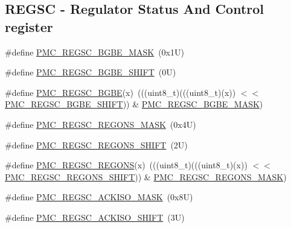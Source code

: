 \subsection*{R\+E\+G\+SC -\/ Regulator Status And Control register}
\begin{DoxyCompactItemize}
\item 
\#define \mbox{\hyperlink{group___p_m_c___register___masks_ga98cf5c98c133e20fb620faa6ca29d98e}{P\+M\+C\+\_\+\+R\+E\+G\+S\+C\+\_\+\+B\+G\+B\+E\+\_\+\+M\+A\+SK}}~(0x1\+U)
\item 
\#define \mbox{\hyperlink{group___p_m_c___register___masks_ga2e23aa8155158c86fc53ccd8baccf24d}{P\+M\+C\+\_\+\+R\+E\+G\+S\+C\+\_\+\+B\+G\+B\+E\+\_\+\+S\+H\+I\+FT}}~(0\+U)
\item 
\#define \mbox{\hyperlink{group___p_m_c___register___masks_gafb37a90d087dbf5bc4c3b654e33d6ef7}{P\+M\+C\+\_\+\+R\+E\+G\+S\+C\+\_\+\+B\+G\+BE}}(x)~(((uint8\+\_\+t)(((uint8\+\_\+t)(x)) $<$$<$ \mbox{\hyperlink{group___p_m_c___register___masks_ga2e23aa8155158c86fc53ccd8baccf24d}{P\+M\+C\+\_\+\+R\+E\+G\+S\+C\+\_\+\+B\+G\+B\+E\+\_\+\+S\+H\+I\+FT}})) \& \mbox{\hyperlink{group___p_m_c___register___masks_ga98cf5c98c133e20fb620faa6ca29d98e}{P\+M\+C\+\_\+\+R\+E\+G\+S\+C\+\_\+\+B\+G\+B\+E\+\_\+\+M\+A\+SK}})
\item 
\#define \mbox{\hyperlink{group___p_m_c___register___masks_gab830f2c82eef6d0db7caab8ee5689ba6}{P\+M\+C\+\_\+\+R\+E\+G\+S\+C\+\_\+\+R\+E\+G\+O\+N\+S\+\_\+\+M\+A\+SK}}~(0x4\+U)
\item 
\#define \mbox{\hyperlink{group___p_m_c___register___masks_ga06b4e6d970f2610a635c92bb1270541d}{P\+M\+C\+\_\+\+R\+E\+G\+S\+C\+\_\+\+R\+E\+G\+O\+N\+S\+\_\+\+S\+H\+I\+FT}}~(2\+U)
\item 
\#define \mbox{\hyperlink{group___p_m_c___register___masks_ga5c4e1173d8cdf7f0318071b77331fb83}{P\+M\+C\+\_\+\+R\+E\+G\+S\+C\+\_\+\+R\+E\+G\+O\+NS}}(x)~(((uint8\+\_\+t)(((uint8\+\_\+t)(x)) $<$$<$ \mbox{\hyperlink{group___p_m_c___register___masks_ga06b4e6d970f2610a635c92bb1270541d}{P\+M\+C\+\_\+\+R\+E\+G\+S\+C\+\_\+\+R\+E\+G\+O\+N\+S\+\_\+\+S\+H\+I\+FT}})) \& \mbox{\hyperlink{group___p_m_c___register___masks_gab830f2c82eef6d0db7caab8ee5689ba6}{P\+M\+C\+\_\+\+R\+E\+G\+S\+C\+\_\+\+R\+E\+G\+O\+N\+S\+\_\+\+M\+A\+SK}})
\item 
\#define \mbox{\hyperlink{group___p_m_c___register___masks_ga35ced6f0f133b2d5892bdcba3e0b2832}{P\+M\+C\+\_\+\+R\+E\+G\+S\+C\+\_\+\+A\+C\+K\+I\+S\+O\+\_\+\+M\+A\+SK}}~(0x8\+U)
\item 
\#define \mbox{\hyperlink{group___p_m_c___register___masks_gad2b9b6ce6aa455e8607fd3c2d1647544}{P\+M\+C\+\_\+\+R\+E\+G\+S\+C\+\_\+\+A\+C\+K\+I\+S\+O\+\_\+\+S\+H\+I\+FT}}~(3\+U)

\end{DoxyCompactItemize}
